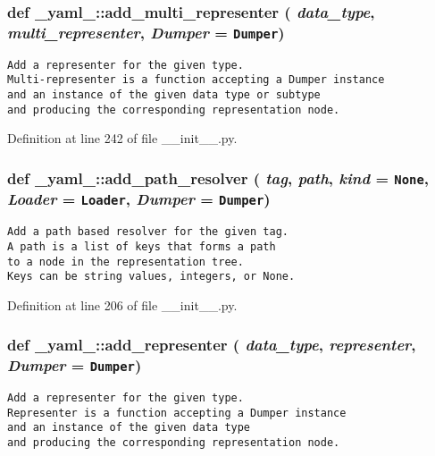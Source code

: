 \subsubsection{\setlength{\rightskip}{0pt plus 5cm}def \_\-yaml\_\-::add\_\-multi\_\-representer ( {\em data\_\-type},  {\em multi\_\-representer},  {\em Dumper} = {\tt Dumper})}\label{namespace__yaml___e67e1444465faeec7391f8a97866456d}




\footnotesize\begin{verbatim}
Add a representer for the given type.
Multi-representer is a function accepting a Dumper instance
and an instance of the given data type or subtype
and producing the corresponding representation node.
\end{verbatim}
\normalsize
 

Definition at line 242 of file \_\-\_\-init\_\-\_\-.py.
\subsubsection{\setlength{\rightskip}{0pt plus 5cm}def \_\-yaml\_\-::add\_\-path\_\-resolver ( {\em tag},  {\em path},  {\em kind} = {\tt None},  {\em Loader} = {\tt Loader},  {\em Dumper} = {\tt Dumper})}\label{namespace__yaml___ec997966bed2b1e44d68ce87474025ed}




\footnotesize\begin{verbatim}
Add a path based resolver for the given tag.
A path is a list of keys that forms a path
to a node in the representation tree.
Keys can be string values, integers, or None.
\end{verbatim}
\normalsize
 

Definition at line 206 of file \_\-\_\-init\_\-\_\-.py.
\subsubsection{\setlength{\rightskip}{0pt plus 5cm}def \_\-yaml\_\-::add\_\-representer ( {\em data\_\-type},  {\em representer},  {\em Dumper} = {\tt Dumper})}\label{namespace__yaml___64c128d4086f49f0c9e1c9a866a1194d}




\footnotesize\begin{verbatim}
Add a representer for the given type.
Representer is a function accepting a Dumper instance
and an instance of the given data type
and producing the corresponding representation node.
\end{verbatim}
\normalsize
 

